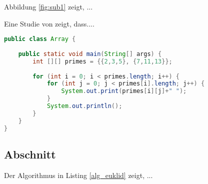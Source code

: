 \documentclass[twoside,12pt]{scrartcl}
\begin{document}
	\vspace{1cm}
	
	Abbildung \ref{fig:sub1} zeigt, ...
	
	
	\vspace{1cm}
	
	
	
	
	
	
	
	
	
	
	
	
	
	
	
	
\vspace{0.5cm}

Eine Studie von \citet{Hofstede2014} zeigt, dass....

\begin{lstlisting}[language=Java, caption={Matrix},label=alg_euklid,style=eclipse-java,moreemph={[2]out}]
public class Array {
	
	public static void main(String[] args) {
		int [][] primes = {{2,3,5}, {7,11,13}};
		
		for (int i = 0; i < primes.length; i++) {
			for (int j = 0; j < primes[i].length; j++) {
				System.out.print(primes[i][j]+" ");
			}
			System.out.println();
		}
	}
}
\end{lstlisting}

\subsection{Abschnitt}

	\blindtext
	
	\vspace{1cm}
	Der Algorithmus in Listing \ref{alg_euklid} zeigt, ...
		\vspace{1cm}
	
\end{document}
